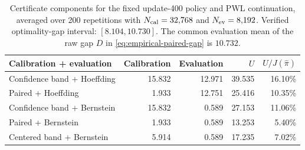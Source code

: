 \begin{table}[H]
\caption{Certificate components for the fixed update-400 policy and PWL continuation, averaged over 200 repetitions with $N_{\rm cal}=32{,}768$ and $N_{\rm ev}=8{,}192$. Verified optimality-gap interval: $[8.104,10.730]$. The common evaluation mean of the raw gap $D$ in \eqref{eq:empirical-paired-gap} is $10.732$.}
\label{tab:coupled-ablation}
\centering\footnotesize
\setlength{\tabcolsep}{3pt}
\begin{tabular}{@{}lrrrr@{}}
\toprule
Calibration + evaluation & Calibration & Evaluation & $U$ & $U/J(\widehat\pi)$\\
\midrule
Confidence band + Hoeffding & 15.832 & 12.971 & 39.535 & 16.10\%\\
Paired + Hoeffding & 1.933 & 12.751 & 25.416 & 10.35\%\\
Confidence band + Bernstein & 15.832 & 0.589 & 27.153 & 11.06\%\\
Paired + Bernstein & 1.933 & 0.589 & 13.253 & 5.40\%\\
Centered band + Bernstein & 5.914 & 0.589 & 17.235 & 7.02\%\\
\bottomrule
\end{tabular}
\end{table}
